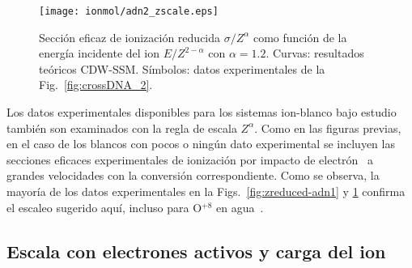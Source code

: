 \begin{figure}
\centering
\texttt{[image: ionmol/adn2\_zscale.eps]}
\caption[Sección eficaz de ionización reducida por $Z$ y $\alpha$ 
(Parte II).]
{Sección eficaz de ionización reducida $\sigma/Z^{\alpha}$ como función
de la energía incidente del ion $E/Z^{2-\alpha}$ con $\alpha=1.2$. 
Curvas: resultados teóricos CDW-SSM. 
Símbolos: datos experimentales de la Fig.~\ref{fig:crossDNA_2}.}
\label{fig:zreduced-adn2}
\end{figure} 

Los datos experimentales disponibles para los sistemas ion-blanco bajo 
estudio~\cite{Iriki:11,Sens:20,Bhattacharjee:19,itoh2013,wolff2014,
wang2016,agnihotri2012,agnihotri2013,Luna2007,Bolorizadeh86,H_Rudd85,
He_Rudd85,toburen80,Ohsawa05,Bhattacharjee:17,DalCappello:09,
Bhattacharjee:16} también son examinados con la regla de escala 
$Z^\alpha$. Como en las figuras previas, en el caso de los 
blancos con pocos o ningún dato experimental se incluyen las secciones 
eficaces experimentales de ionización por impacto de 
electrón~\cite{Rahman:16,bug2017,wolf2019,fuss2009} a grandes 
velocidades con la conversión correspondiente. Como se observa, la 
mayoría de los datos experimentales en la Figs.~\ref{fig:zreduced-adn1} 
y \ref{fig:zreduced-adn2} confirma el escaleo sugerido aquí, incluso 
para O$^{+8}$ en agua~\cite{Bhattacharjee:16}. 

\subsection{Escala con electrones activos y carga del ion}
\label{sec:nez_scaling}

